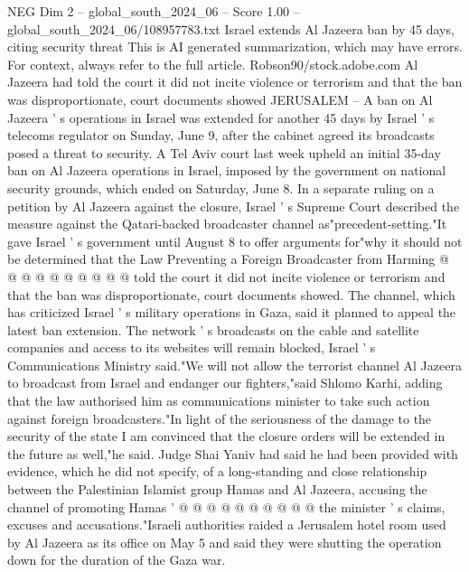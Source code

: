 \begin{textsample}{NEG Dim 2 – global\_south\_2024\_06 – Score 1.00 – global\_south\_2024\_06/108957783.txt}  \label{ex:f2_neg_397}
Israel extends Al Jazeera ban by 45 days, citing security threat This is AI generated summarization, which may have errors.
For context, always refer to the full article.
Robson90/stock.adobe.com Al Jazeera had told the court it did not incite violence or terrorism and that the ban was disproportionate, court documents showed JERUSALEM -- A ban on Al Jazeera ' s operations in Israel was extended for another 45 days by Israel ' s telecoms regulator on Sunday, June 9, after the cabinet agreed its broadcasts posed a threat to security.
A Tel Aviv court last week upheld an initial 35-day ban on Al Jazeera operations in Israel, imposed by the government on national security grounds, which ended on Saturday, June 8.
In a separate ruling on a petition by Al Jazeera against the closure, Israel ' s Supreme Court described the measure against the Qatari-backed broadcaster channel as"precedent-setting."It gave Israel ' s government until August 8 to offer arguments for"why it should not be determined that the Law Preventing a Foreign Broadcaster from Harming @ @ @ @ @ @ @ @ @ @ told the court it did not incite violence or terrorism and that the ban was disproportionate, court documents showed.
The channel, which has criticized Israel ' s military operations in Gaza, said it planned to appeal the latest ban extension.
The network ' s broadcasts on the cable and satellite companies and access to its websites will remain blocked, Israel ' s Communications Ministry said."We will not allow the terrorist channel Al Jazeera to broadcast from Israel and endanger our fighters,"said Shlomo Karhi, adding that the law authorised him as communications minister to take such action against foreign broadcasters."In light of the seriousness of the damage to the security of the state I am convinced that the closure orders will be extended in the future as well,"he said.
Judge Shai Yaniv had said he had been provided with evidence, which he did not specify, of a long-standing and close relationship between the Palestinian Islamist group Hamas and Al Jazeera, accusing the channel of promoting Hamas ' @ @ @ @ @ @ @ @ @ @ the minister ' s claims, excuses and accusations."Israeli authorities raided a Jerusalem hotel room used by Al Jazeera as its office on May 5 and said they were shutting the operation down for the duration of the Gaza war.

\end{textsample}
